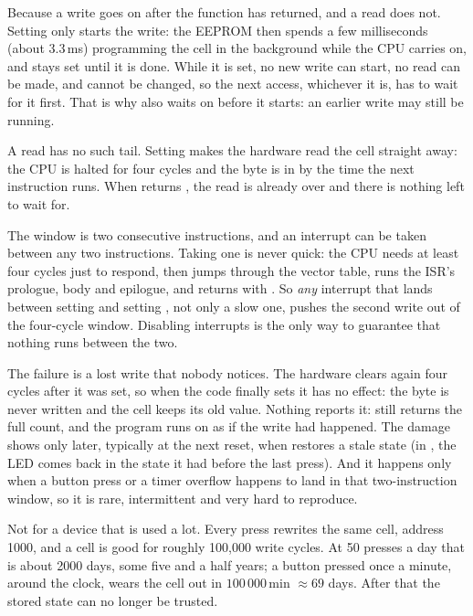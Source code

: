 
Because a write goes on after the function has returned, and a read does not. Setting 
only starts the write: the EEPROM then spends a few milliseconds (about 3.3\,ms) programming the
cell in the background while the CPU carries on, and  stays set until it is done. While
it is set, no new write can start, no read can be made, and  cannot be changed, so the
next access, whichever it is, has to wait for it first. That is why  also
waits on  before it starts: an earlier write may still be running.

A read has no such tail. Setting  makes the hardware read the cell straight away: the
CPU is halted for four cycles and the byte is in  by the time the next instruction runs.
When  returns , the read is already over and there is nothing
left to wait for.

The window is two consecutive instructions, and an interrupt can be taken between any two
instructions. Taking one is never quick: the CPU needs at least four cycles just to respond, then
jumps through the vector table, runs the ISR's prologue, body and epilogue, and returns with
. So \emph{any} interrupt that lands between setting  and setting
, not only a slow one, pushes the second write out of the four-cycle window. Disabling
interrupts is the only way to guarantee that nothing runs between the two.

The failure is a lost write that nobody notices. The hardware clears  again four cycles
after it was set, so when the code finally sets  it has no effect: the byte is never
written and the cell keeps its old value. Nothing reports it:  still returns
the full count, and the program runs on as if the write had happened. The damage shows only later,
typically at the next reset, when  restores a stale state (in , the
LED comes back in the state it had before the last press). And it happens only when a button press
or a timer overflow happens to land in that two-instruction window, so it is rare, intermittent and
very hard to reproduce.

Not for a device that is used a lot. Every press rewrites the same cell, address 1000, and a cell
is good for roughly 100,000 write cycles. At 50 presses a day that is about 2000 days, some five
and a half years; a button pressed once a minute, around the clock, wears the cell out in
$100\,000$\,min $\approx 69$ days. After that the stored state can no longer be trusted.

